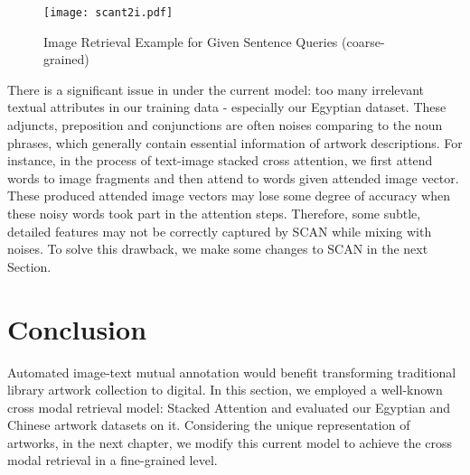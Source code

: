 \begin{figure}[h!]
\centering
\texttt{[image: scant2i.pdf]}
\caption{Image Retrieval Example for Given Sentence Queries (coarse-grained)}
\label{fig:scant2i}
\end{figure}

There is a significant issue in under the current model: too many irrelevant textual attributes in our training data - especially our Egyptian dataset. These adjuncts, preposition and conjunctions are often noises comparing to the noun phrases, which generally contain essential information of artwork descriptions. For instance, in the process of text-image stacked cross attention, we first attend words to image fragments and then attend to words given attended image vector. These produced attended image vectors may lose some degree of accuracy when these noisy words took part in the attention steps. Therefore, some subtle, detailed features may not be correctly captured by SCAN while mixing with noises. To solve this drawback, we make some changes to SCAN in the next Section.


\section{Conclusion}
Automated image-text mutual annotation would benefit transforming traditional library artwork collection to digital. In this section, we employed a well-known cross modal retrieval model: Stacked Attention and evaluated our Egyptian and Chinese artwork datasets on it. Considering the unique representation of artworks, in the next chapter, we modify this current model to achieve the cross modal retrieval in a fine-grained level.


